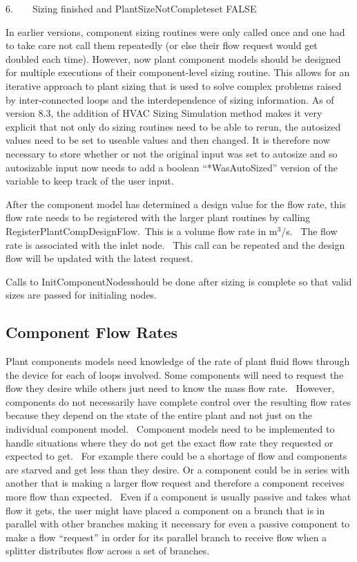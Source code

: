 6.~~~~Sizing finished and PlantSizeNotCompleteset FALSE

In earlier versions, component sizing routines were only called once and one had to take care not call them repeatedly (or else their flow request would get doubled each time). However, now plant component models should be designed for multiple executions of their component-level sizing routine. This allows for an iterative approach to plant sizing that is used to solve complex problems raised by inter-connected loops and the interdependence of sizing information. As of version 8.3, the addition of HVAC Sizing Simulation method makes it very explicit that not only do sizing routines need to be able to rerun, the autosized values need to be set to useable values and then changed. It is therefore now necessary to store whether or not the original input was set to autosize and so autosizable input now needs to add a boolean ``*WasAutoSized'' version of the variable to keep track of the user input.

After the component model has determined a design value for the flow rate, this flow rate needs to be registered with the larger plant routines by calling RegisterPlantCompDesignFlow.~This is a volume flow rate in m\(^{3}\)/s.~ The flow rate is associated with the inlet node.~ This call can be repeated and the design flow will be updated with the latest request.

Calls to InitComponentNodesshould be done after sizing is complete so that valid sizes are passed for initialing nodes.

\subsection{Component Flow Rates}\label{component-flow-rates}

Plant components models need knowledge of the rate of plant fluid flows through the device for each of loops involved. Some components will need to request the flow they desire while others just need to know the mass flow rate.~ However, components do not necessarily have complete control over the resulting flow rates because they depend on the state of the entire plant and not just on the individual component model.~ Component models need to be implemented to handle situations where they do not get the exact flow rate they requested or expected to get.~ For example there could be a shortage of flow and components are starved and get less than they desire. Or a component could be in series with another that is making a larger flow request and therefore a component receives more flow than expected.~ Even if a component is usually passive and takes what flow it gets, the user might have placed a component on a branch that is in parallel with other branches making it necessary for even a passive component to make a flow ``request'' in order for its parallel branch to receive flow when a splitter distributes flow across a set of branches.

